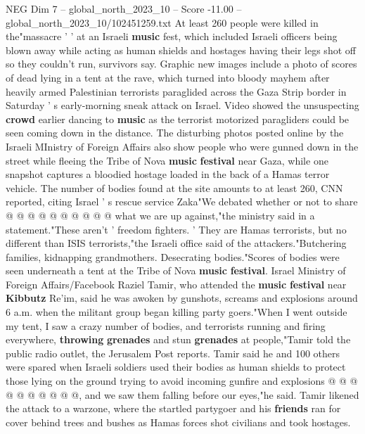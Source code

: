 \begin{textsample}{NEG Dim 7 – global\_north\_2023\_10 – Score -11.00 – global\_north\_2023\_10/102451259.txt}  \label{ex:f7_neg_025}
At least 260 people were killed in the"massacre ' ' at an Israeli \textbf{music} fest, which included Israeli officers being blown away while acting as human shields and hostages having their legs shot off so they couldn't run, survivors say.
Graphic new images include a photo of scores of dead lying in a tent at the rave, which turned into bloody mayhem after heavily armed Palestinian terrorists paraglided across the Gaza Strip border in Saturday ' s early-morning sneak attack on Israel.
Video showed the unsuspecting \textbf{crowd} earlier dancing to \textbf{music} as the terrorist motorized paragliders could be seen coming down in the distance.
The disturbing photos posted online by the Israeli MInistry of Foreign Affairs also show people who were gunned down in the street while fleeing the Tribe of Nova \textbf{music} \textbf{festival} near Gaza, while one snapshot captures a bloodied hostage loaded in the back of a Hamas terror vehicle.
The number of bodies found at the site amounts to at least 260, CNN reported, citing Israel ' s rescue service Zaka"We debated whether or not to share @ @ @ @ @ @ @ @ @ @ what we are up against,"the ministry said in a statement."These aren't ' freedom fighters. ' They are Hamas terrorists, but no different than ISIS terrorists,"the Israeli office said of the attackers."Butchering families, kidnapping grandmothers.
Desecrating bodies."Scores of bodies were seen underneath a tent at the Tribe of Nova \textbf{music} \textbf{festival}.
Israel Ministry of Foreign Affairs/Facebook Raziel Tamir, who attended the \textbf{music} \textbf{festival} near \textbf{Kibbutz} Re'im, said he was awoken by gunshots, screams and explosions around 6 a.m. when the militant group began killing party goers."When I went outside my tent, I saw a crazy number of bodies, and terrorists running and firing everywhere, \textbf{throwing} \textbf{grenades} and stun \textbf{grenades} at people,"Tamir told the public radio outlet, the Jerusalem Post reports.
Tamir said he and 100 others were spared when Israeli soldiers used their bodies as human shields to protect those lying on the ground trying to avoid incoming gunfire and explosions @ @ @ @ @ @ @ @ @ @, and we saw them falling before our eyes,"he said.
Tamir likened the attack to a warzone, where the startled partygoer and his \textbf{friends} ran for cover behind trees and bushes as Hamas forces shot civilians and took hostages.

\end{textsample}
